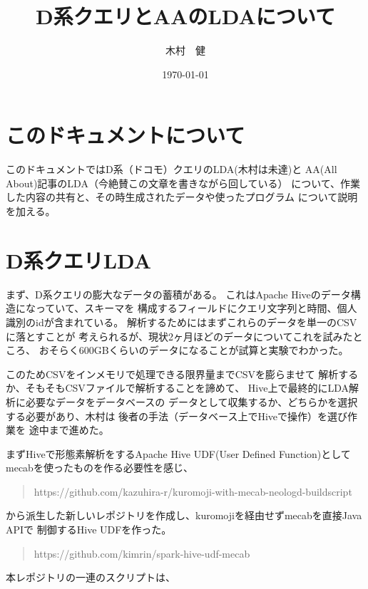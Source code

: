 \documentclass[uplatex]{jsarticle}
\begin{document}
\title{\huge D系クエリとAAのLDAについて}
\author{木村　健}
\date{\today}
\maketitle

\section{このドキュメントについて}
このドキュメントではD系（ドコモ）クエリのLDA(木村は未達)と
AA(All About)記事のLDA（今絶賛この文章を書きながら回している）
について、作業した内容の共有と、その時生成されたデータや使ったプログラム
について説明を加える。

\section{D系クエリLDA}
まず、D系クエリの膨大なデータの蓄積がある。
これはApache Hiveのデータ構造になっていて、スキーマを
構成するフィールドにクエリ文字列と時間、個人識別のidが含まれている。
解析するためにはまずこれらのデータを単一のCSVに落とすことが
考えられるが、現状2ヶ月ほどのデータについてこれを試みたところ、
おそらく600GBくらいのデータになることが試算と実験でわかった。

このためCSVをインメモリで処理できる限界量までCSVを膨らませて
解析するか、そもそもCSVファイルで解析することを諦めて、
Hive上で最終的にLDA解析に必要なデータをデータベースの
データとして収集するか、どちらかを選択する必要があり、木村は
後者の手法（データベース上でHiveで操作）を選び作業を
途中まで進めた。

まずHiveで形態素解析をするApache Hive UDF(User Defined Function)として
mecabを使ったものを作る必要性を感じ、

\begin{quote}

https://github.com/kazuhira-r/kuromoji-with-mecab-neologd-buildscript

\end{quote}


から派生した新しいレポジトリを作成し、kuromojiを経由せずmecabを直接Java APIで
制御するHive UDFを作った。

\begin{quote}

https://github.com/kimrin/spark-hive-udf-mecab

\end{quote}

本レポジトリの一連のスクリプトは、
\end{document}

